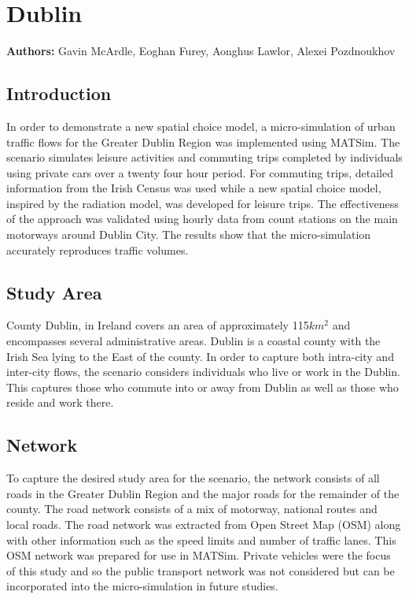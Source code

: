 \section{Dublin}
\label{sec:dublin}
\hfill \textbf{Authors:} Gavin McArdle, Eoghan Furey, Aonghus Lawlor, Alexei Pozdnoukhov

\subsection{Introduction}
In order to demonstrate a new spatial choice model, a micro-simulation of urban traffic flows for the Greater Dublin Region was implemented using MATSim. The scenario simulates leisure activities and commuting trips completed by individuals using private cars over a twenty four hour period. For commuting trips, detailed information from the Irish Census was used while a new spatial choice model, inspired by the radiation model, was developed for leisure trips. The effectiveness of the approach was validated using hourly data from count stations on the main motorways around Dublin City. The results show that the micro-simulation accurately reproduces traffic volumes.

\subsection{Study Area}
County Dublin, in Ireland covers an area of approximately 115$km^2$ and encompasses several administrative areas. Dublin is a coastal county with the Irish Sea lying to the East of the county. In order to capture both intra-city and inter-city flows, the scenario considers individuals who live or work in the Dublin. This captures those who commute into or away from Dublin as well as those who reside and work there.

\subsection{Network}
To capture the desired study area for the scenario, the network consists of all roads in the Greater Dublin Region and the major roads for the remainder of the county.  The road network consists of a mix of motorway, national routes and local roads. The road network was extracted from Open Street Map (OSM) along with other information such as the speed limits and number of traffic lanes. This OSM network was prepared for use in MATSim. Private vehicles were the focus of this study and so the public transport network was not considered but can be incorporated into the micro-simulation in future studies.

